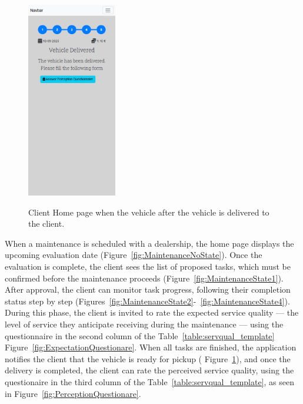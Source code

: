 \begin{figure}[h]
  \caption{Client Home page when the vehicle after the vehicle is delivered to the client.}
  \centering
  \includegraphics[width=0.35\textwidth]{figs/Implementation/client/MaintenanceState5}
  \label{fig:MaintenanceState5}
\end{figure}



When a maintenance is scheduled with a dealership, the home page displays the upcoming evaluation date (Figure~\ref{fig:MaintenanceNoState}). Once the evaluation is complete, the client sees the list of proposed tasks, which must be confirmed before the maintenance proceeds (Figure~\ref{fig:MaintenanceState1}). After approval, the client can monitor task progress, following their completion status step by step (Figures~\ref{fig:MaintenanceState2}-~\ref{fig:MaintenanceState4}). During this phase, the client is invited to rate the expected service quality — the level of service they anticipate receiving during the maintenance — using the questionnaire in the second column of the Table~\ref{table:servqual_template} Figure~\ref{fig:ExpectationQuestionare}. When all tasks are finished, the application notifies the client that the vehicle is ready for pickup ( Figure~\ref{fig:MaintenanceState5}), and once the delivery is completed, the client can rate the perceived service quality, using the questionaire in the third column of the Table~\ref{table:servqual_template}, as seen in Figure~\ref{fig:PerceptionQuestionare}.

